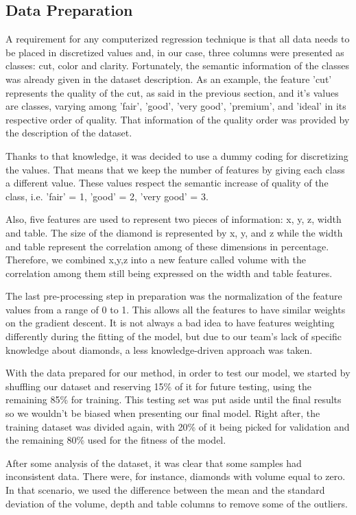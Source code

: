 \documentclass[conference]{IEEEtran}
\begin{document}
\subsection{Data Preparation}	
    A requirement for any computerized regression technique is that all data needs to be placed in discretized values and, in our case, three columns were presented as classes: cut, color and clarity. Fortunately, the semantic information of the classes was already given in the dataset description. As an example, the feature 'cut' represents the quality of the cut, as said in the previous section, and it's values are classes, varying among 'fair', 'good', 'very good', 'premium', and 'ideal' in its respective order of quality. That information of the quality order was provided by the description of the dataset.
    
    Thanks to that knowledge, it was decided to use a dummy coding for discretizing the values. That means that we keep the number of features by giving each class a different value. These values respect the semantic increase of quality of the class, i.e. 'fair' = 1, 'good' = 2, 'very good' = 3.
    
    Also, five features are used to represent two pieces of information: x, y, z, width and table. The size of the diamond is represented by x, y, and z while the width and table represent the correlation among of these dimensions in percentage. Therefore, we combined x,y,z into a new feature called volume with the correlation among them still being expressed on the width and table features.
    
    The last pre-processing step in preparation was the normalization of the feature values from a range of 0 to 1. This allows all the features to have similar weights on the gradient descent. It is not always a bad idea to have features weighting differently during the fitting of the model, but due to our team's lack of specific knowledge about diamonds, a less knowledge-driven approach was taken.
    
    With the data prepared for our method, in order to test our model, we started by shuffling our dataset and reserving 15\% of it for future testing, using the remaining 85\% for training. This testing set was put aside until the final results so we wouldn't be biased when presenting our final model. Right after, the training dataset was divided again, with 20\% of it being picked for validation and the remaining 80\% used for the fitness of the model.
    
    After some analysis of the dataset, it was clear that some samples had inconsistent data. There were, for instance, diamonds with volume equal to zero. In that scenario, we used the difference between the mean and the standard deviation of the volume, depth and table columns to remove some of the outliers.
    
\end{document}
